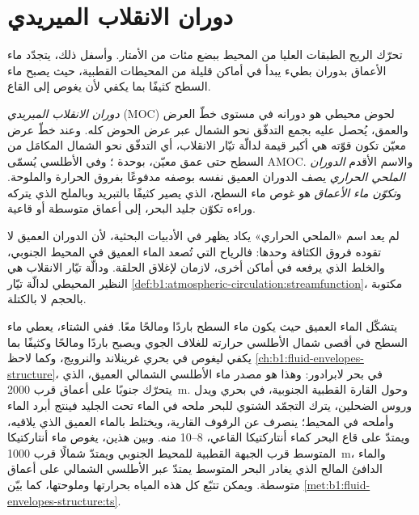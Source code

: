 \section{دوران الانقلاب الميريدي}\label{sec:b1:ocean-circulation:moc}

تحرّك الريح الطبقات العليا من المحيط ببضع مئات من الأمتار. وأسفل ذلك، يتجدّد ماء الأعماق بدوران بطيء يبدأ في أماكن قليلة من المحيطات القطبية، حيث يصبح ماء السطح كثيفًا بما يكفي لأن يغوص إلى القاع.

\begin{definition}\label{def:b1:ocean-circulation:moc}
\emph{دوران الانقلاب الميريدي}
(MOC) لحوض محيطي هو دورانه في مستوى خطّ العرض والعمق، يُحصل عليه بجمع التدفّق نحو الشمال عبر عرض الحوض كله. وعند خطّ عرض معيّن تكون قوّته هي أكبر قيمة لدالّة تيّار الانقلاب، أي التدفّق نحو الشمال المكامَل من السطح حتى عمق معيّن، بوحدة ؛ وفي الأطلسي يُسمّى AMOC. والاسم الأقدم \emph{الدوران الملحي الحراري} يصف الدوران العميق نفسه بوصفه مدفوعًا بفروق الحرارة والملوحة. و\emph{تكوّن ماء الأعماق} هو غوص ماء السطح، الذي يصير كثيفًا بالتبريد وبالملح الذي يتركه وراءه تكوّن جليد البحر، إلى أعماق متوسطة أو قاعية.
\end{definition}

لم يعد اسم «الملحي الحراري» يكاد يظهر في الأدبيات البحثية، لأن الدوران العميق لا تقوده فروق الكثافة وحدها: فالرياح التي تُصعد الماء العميق في المحيط الجنوبي، والخلط الذي يرفعه في أماكن أخرى، لازمان لإغلاق الحلقة. ودالّة تيّار الانقلاب هي النظير المحيطي لدالّة تيّار \cref{def:b1:atmospheric-circulation:streamfunction}، مكتوبة بالحجم لا بالكتلة.

يتشكّل الماء العميق حيث يكون ماء السطح باردًا ومالحًا معًا. ففي الشتاء، يعطي ماء السطح في أقصى شمال الأطلسي حرارته للغلاف الجوي ويصبح باردًا ومالحًا وكثيفًا بما يكفي ليغوص في بحري غرينلاند والنرويج، وكما لاحظ \cref{ch:b1:fluid-envelopes-structure}، في بحر لابرادور: وهذا هو مصدر ماء الأطلسي الشمالي العميق، الذي يتحرّك جنوبًا على أعماق قرب \qty{2000}{m}. وحول القارة القطبية الجنوبية، في بحري ويدل وروس الضحلين، يترك التجمّد الشتوي للبحر ملحه في الماء تحت الجليد فينتج أبرد الماء وأملحه في المحيط؛ ينصرف عن الرفوف القارية، ويختلط بالماء العميق الذي يلاقيه، ويمتدّ على قاع البحر كماء أنتاركتيكا القاعي، \qtyrange{8}{10}{\sverdrup} منه. وبين هذين، يغوص ماء أنتاركتيكا المتوسط قرب الجبهة القطبية للمحيط الجنوبي ويمتدّ شمالًا قرب \qty{1000}{m}، والماء الدافئ المالح الذي يغادر البحر المتوسط يمتدّ عبر الأطلسي الشمالي على أعماق متوسطة. ويمكن تتبّع كل هذه المياه بحرارتها وملوحتها، كما بيّن \cref{met:b1:fluid-envelopes-structure:ts}.


